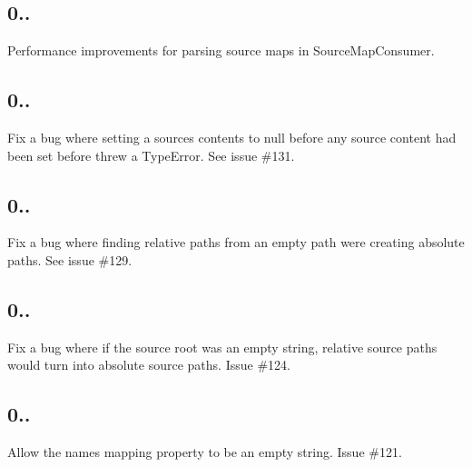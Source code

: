 \subsection*{0..}


\begin{DoxyItemize}
\item Performance improvements for parsing source maps in Source\+Map\+Consumer.
\end{DoxyItemize}

\subsection*{0..}


\begin{DoxyItemize}
\item Fix a bug where setting a source\textquotesingle{}s contents to null before any source content had been set before threw a Type\+Error. See issue \#131.
\end{DoxyItemize}

\subsection*{0..}


\begin{DoxyItemize}
\item Fix a bug where finding relative paths from an empty path were creating absolute paths. See issue \#129.
\end{DoxyItemize}

\subsection*{0..}


\begin{DoxyItemize}
\item Fix a bug where if the source root was an empty string, relative source paths would turn into absolute source paths. Issue \#124.
\end{DoxyItemize}

\subsection*{0..}


\begin{DoxyItemize}
\item Allow the {\ttfamily names} mapping property to be an empty string. Issue \#121.
\end{DoxyItemize}

